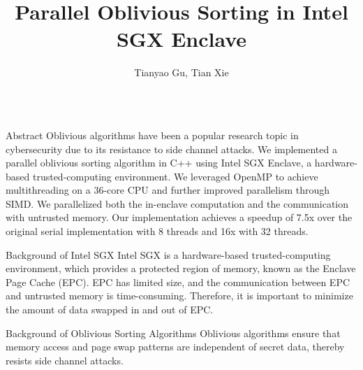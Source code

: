 \documentclass[final,hyperref={pdfpagelabels=false}]{beamer}
\title{Parallel Oblivious Sorting in Intel SGX Enclave}
\author{Tianyao Gu, Tian Xie}
\begin{document}
\begin{frame}
  \begin{columns}[t]

    \begin{column}{.25\linewidth}
      \maketitle
      \begin{block}{Abstract}
        Oblivious algorithms have been a popular research topic in cybersecurity due to its resistance to side channel attacks. We implemented a parallel oblivious sorting algorithm in C++ using Intel SGX Enclave, a hardware-based trusted-computing environment. We leveraged OpenMP to achieve multithreading on a 36-core CPU and further improved parallelism through SIMD. We parallelized both the in-enclave computation and the communication with untrusted memory. Our implementation achieves a speedup of 7.5x over the original serial implementation with 8 threads and 16x with 32 threads.
      \end{block}

      \begin{block}{Background of Intel SGX}
        Intel SGX is a hardware-based trusted-computing environment, which provides a protected region of memory, known as the Enclave Page Cache (EPC). EPC has limited size, and the communication between EPC and untrusted memory is time-consuming. Therefore, it is important to minimize the amount of data swapped in and out of EPC.
      \end{block}

      \begin{block}{Background of Oblivious Sorting Algorithms}
      Oblivious algorithms ensure that memory access and page swap patterns are independent of secret data, thereby resists side channel attacks.
      \end{block}


\end{column}
\end{columns}
\end{frame}
\end{document}
